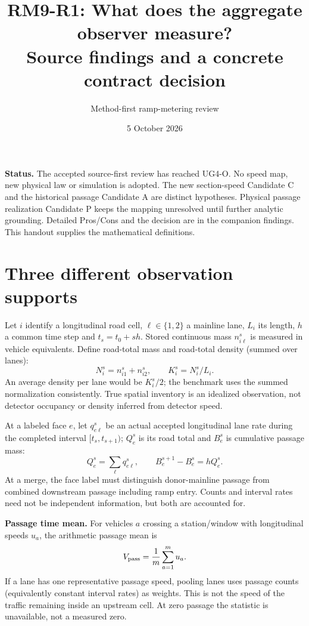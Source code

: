 \documentclass[10pt,a4paper]{article}
\title{RM9-R1: What does the aggregate observer measure?\\Source findings and a concrete contract decision}
\author{Method-first ramp-metering review}
\date{5 October 2026}
\begin{document}
\maketitle
\textbf{Status.} The accepted source-first review has reached UG4-O.
No speed map, new physical law or simulation is adopted. The new section-speed
Candidate C and the historical passage Candidate A are distinct hypotheses.
Physical passage realization Candidate P keeps the mapping unresolved until
further analytic grounding. Detailed Pros/Cons and the decision are in the
companion findings. This handout supplies the mathematical definitions.

\section{Three different observation supports}
Let $i$ identify a longitudinal road cell, $\ell\in\{1,2\}$ a mainline lane,
$L_i$ its length, $h$ a common time step and $t_s=t_0+sh$.
Stored continuous mass $n_{i\ell}^s$ is measured in vehicle equivalents.
Define road-total mass and road-total density (summed over lanes):
\begin{equation}
N_i^s=n_{i1}^s+n_{i2}^s,\qquad K_i^s=N_i^s/L_i.
\end{equation}
An average density per lane would be $K_i^s/2$; the benchmark uses the summed
normalization consistently. True spatial inventory is an idealized observation,
not detector occupancy or density inferred from detector speed.

At a labeled face $e$, let $q_{e\ell}^s$ be an actual accepted longitudinal
lane rate during the completed interval $[t_s,t_{s+1})$; $Q_e^s$ is its road
total and $B_e^s$ is cumulative passage mass:
\begin{equation}
Q_e^s=\sum_\ell q_{e\ell}^s,\qquad
B_e^{s+1}-B_e^s=hQ_e^s.
\end{equation}
At a merge, the face label must distinguish donor-mainline passage from
combined downstream passage including ramp entry. Counts and interval rates
need not be independent information, but both are accounted for.

\textbf{Passage time mean.} For vehicles $a$ crossing a station/window with
longitudinal speeds $u_a$, the arithmetic passage mean is
\begin{equation}
V_{\rm pass}=\frac{1}{m}\sum_{a=1}^{m}u_a.
\end{equation}
If a lane has one representative passage speed, pooling lanes uses passage
counts (equivalently constant interval rates) as weights. This is not the
speed of the traffic remaining inside an upstream cell. At zero passage the
statistic is unavailable, not a measured zero.
\end{document}
